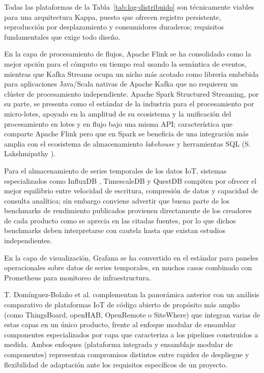Todas las plataformas de la Tabla~\ref{tab:log-distribuido} son técnicamente viables para una arquitectura Kappa, puesto que ofrecen registro persistente, reproducción por desplazamiento y consumidores duraderos; requisitos fundamentales que exige todo diseño.

En la capa de procesamiento de flujos, Apache Flink se ha consolidado como la mejor opción para el cómputo en tiempo real usando la semántica de eventos, mientras que Kafka Streams ocupa un nicho más acotado como librería embebida para aplicaciones Java/Scala nativas de Apache Kafka que no requieren un clúster de procesamiento independiente. Apache Spark Structured Streaming, por su parte, se presenta como el estándar de la industria para el procesamiento por micro-lotes, apoyado en la amplitud de su ecosistema y la unificación del procesamiento en lotes y en flujo bajo una misma API; característica que comparte Apache Flink pero que en Spark se beneficia de una integración más amplia con el ecosistema de almacenamiento \textit{lakehouse} y herramientas SQL (S. Lakshmipathy \cite{lakshmipathy2025}).

Para el almacenamiento de series temporales de los datos IoT, sistemas especializados como InfluxDB \cite{influxdata2025}, TimescaleDB \cite{tigerdata2026} y QuestDB \cite{questdb2025} compiten por ofrecer el mejor equilibrio entre velocidad de escritura, compresión de datos y capacidad de consulta analítica; sin embargo conviene advertir que buena parte de los benchmarks de rendimiento publicados provienen directamente de los creadores de cada producto como se aprecia en las citadas fuentes, por lo que dichos benchmarks deben interpretarse con cautela hasta que existan estudios independientes.

En la capa de visualización, Grafana se ha convertido en el estándar para paneles operacionales sobre datos de series temporales, en muchos casos combinado con Prometheus para monitoreo de infraestructura.

T. Domínguez-Bolaño et al. \cite{dominguez2022} complementan la panorámica anterior con un análisis comparativo de plataformas IoT de código abierto de propósito más amplio (como ThingsBoard, openHAB, OpenRemote o SiteWhere) que integran varias de estas capas en un único producto, frente al enfoque modular de ensamblar componentes especializados por capa que caracteriza a los pipelines construidos a medida. Ambos enfoques (plataforma integrada y ensamblaje modular de componentes) representan compromisos distintos entre rapidez de despliegue y flexibilidad de adaptación ante los requisitos específicos de un proyecto.

